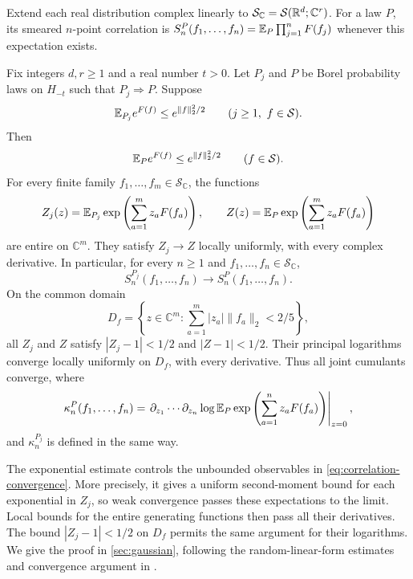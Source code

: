 Extend each real distribution complex linearly to
$\mathcal S_{\mathbb C}=\mathcal S(\mathbb R^d;\mathbb C^r)$.
For a law $P$, its smeared $n$-point correlation is
$S_n^P(f_1,\ldots,f_n)=\mathbb E_P\prod_{j=1}^n F(f_j)$ whenever
this expectation exists.

\begin{theorem}
\label{thm:gaussian-convergence}
Fix integers $d,r\ge1$ and a real number $t>0$. Let $P_j$ and $P$ be Borel probability
laws on $H_{-t}$ such that $P_j\Longrightarrow P$. Suppose
\begin{equation}\label{eq:sequence-gaussian}
 \mathbb E_{P_j}e^{F(f)}\le e^{\|f\|_2^2/2}
 \qquad(j\ge1,\ f\in\mathcal S).
\end{equation}
Then
\begin{equation}\label{eq:limit-continuum-G}
 \mathbb E_P e^{F(f)}\le e^{\|f\|_2^2/2}
 \qquad(f\in\mathcal S).
\end{equation}
For every finite family $f_1,\ldots,f_m\in\mathcal S_{\mathbb C}$,
the functions
\[
 Z_j(z)=\mathbb E_{P_j}\exp\left(\sum_{a=1}^m z_aF(f_a)\right),
 \qquad
 Z(z)=\mathbb E_P\exp\left(\sum_{a=1}^m z_aF(f_a)\right)
\]
are entire on $\mathbb C^m$. They satisfy $Z_j\to Z$ locally
uniformly, with every complex derivative. In particular, for
every $n\ge1$ and $f_1,\ldots,f_n\in\mathcal S_{\mathbb C}$,
\begin{equation}\label{eq:correlation-convergence}
 S_n^{P_j}(f_1,\ldots,f_n)\longrightarrow
 S_n^P(f_1,\ldots,f_n).
\end{equation}
On the common domain
\begin{equation}\label{eq:zero-free-domain}
 D_f=\left\{z\in\mathbb C^m:
                 \sum_{a=1}^m|z_a|\|f_a\|_2<2/5\right\},
\end{equation}
all $Z_j$ and $Z$ satisfy $|Z_j-1|<1/2$ and $|Z-1|<1/2$.
Their principal logarithms converge locally uniformly on $D_f$,
with every derivative. Thus all joint cumulants converge, where
\[
 \kappa_n^P(f_1,\ldots,f_n)
 =\left.\partial_{z_1}\cdots\partial_{z_n}
       \log\mathbb E_P\exp\left(\sum_{a=1}^n z_aF(f_a)\right)
   \right|_{z=0},
\]
and $\kappa_n^{P_j}$ is defined in the same way.
\end{theorem}

The exponential estimate controls the unbounded observables in
\eqref{eq:correlation-convergence}. More precisely, it gives
a uniform second-moment bound for each exponential in $Z_j$,
so weak convergence passes these expectations to the limit.
Local bounds for the entire generating functions then pass all
their derivatives. The bound $|Z_j-1|<1/2$ on
$D_f$ permits the same argument for their
logarithms. We give the proof in \cref{sec:gaussian}, following
the random-linear-form estimates and convergence argument in
\cite[Sections~5.1--5.2 and~6.2]{QED3Manuscript}.

